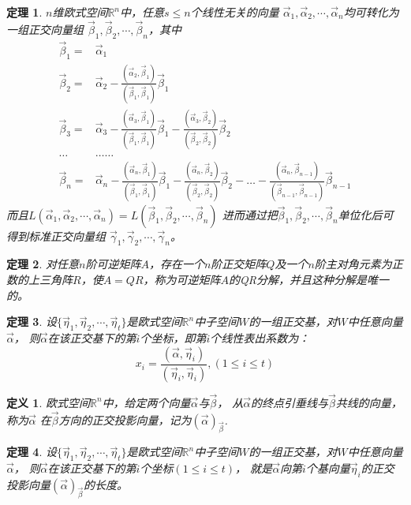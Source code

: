 \documentclass[a4paper]{book}
\newtheorem{Def}{定义}[chapter]
\newtheorem{thm}{定理}[chapter]
\begin{document}
\begin{thm}
$n$维欧式空间$\mathbb{R}^n$中，任意$s\leq n$个线性无关的向量
$\vec{\alpha}_1,\vec{\alpha}_2,\cdots,\vec{\alpha}_n$均可转化为一组正交向量组
$\vec{\beta}_1,\vec{\beta}_2,\cdots,\vec{\beta}_n$，其中
\begin{align*}
\vec{\beta}_1=&\vec{\alpha}_1\\
\vec{\beta}_2=&\vec{\alpha}_2-\frac{(\vec{\alpha}_2,\vec{\beta}_1)}{(\vec{\beta}_1,\vec{\beta}_1)}\vec{\beta}_1\\
\vec{\beta}_3=&\vec{\alpha}_3-\frac{(\vec{\alpha}_3,\vec{\beta}_1)}{(\vec{\beta}_1,\vec{\beta}_1)}\vec{\beta}_1-
              \frac{(\vec{\alpha}_3,\vec{\beta}_2)}{(\vec{\beta}_2,\vec{\beta}_2)}\vec{\beta}_2\\
\ldots&\ldots\ldots \\
\vec{\beta}_n=&\vec{\alpha}_n-\frac{(\vec{\alpha}_n,\vec{\beta}_1)}{(\vec{\beta}_1,\vec{\beta}_1)}\vec{\beta}_1
              -\frac{(\vec{\alpha}_n,\vec{\beta}_2)}{(\vec{\beta}_2,\vec{\beta}_2)}\vec{\beta}_2-\ldots
                -\frac{(\vec{\alpha}_n,\vec{\beta}_{n-1})}{(\vec{\beta}_{n-1},\vec{\beta}_{n-1})}\vec{\beta}_{n-1}
\end{align*}
而且$L(\vec{\alpha}_1,\vec{\alpha}_2,\cdots,\vec{\alpha}_n)=L(\vec{\beta}_1,\vec{\beta}_2,\cdots,\vec{\beta}_n)$
进而通过把$\vec{\beta}_1,\vec{\beta}_2,\cdots,\vec{\beta}_n$单位化后可得到标准正交向量组
$\vec{\gamma}_1,\vec{\gamma}_2,\cdots,\vec{\gamma}_n$。
\end{thm}

\begin{thm}
对任意$n$阶可逆矩阵$A$，存在一个$n$阶正交矩阵$Q$及一个$n$阶主对角元素为正数的上三角阵$R$，使$A=QR$，称为可逆矩阵$A$的QR分解，并且这种分解是唯一的。
\end{thm}

\begin{thm}
设$\{\vec{\eta}_1,\vec{\eta}_2,\cdots,\vec{\eta}_t\}$是欧式空间$\mathbb{R}^n$中子空间$W$的一组正交基，对$W$中任意向量$\vec{\alpha}$，
则$\vec{\alpha}$在该正交基下的第$i$个坐标，即第$i$个线性表出系数为：
\begin{equation*}
x_i=\frac{(\vec{\alpha},\vec{\eta}_i)}{(\vec{\eta}_i,\vec{\eta}_i)},
(1\leq i\leq t)
\end{equation*}
\end{thm}

\begin{Def}
欧式空间$\mathbb{R}^n$中，给定两个向量$\vec{\alpha}$与$\vec{\beta}$，
从$\vec{\alpha}$的终点引垂线与$\vec{\beta}$共线的向量，称为$\vec{\alpha}$
在$\vec{\beta}$方向的正交投影向量，记为$(\vec{\alpha})_{\vec{\beta}}$.
\end{Def}
\begin{thm}
设$\{\vec{\eta}_1,\vec{\eta}_2,\cdots,\vec{\eta}_t\}$是欧式空间$\mathbb{R}^n$中子空间$W$的一组正交基，对$W$中任意向量$\vec{\alpha}$，
则$\vec{\alpha}$在该正交基下的第$i$个坐标$(1\leq i\leq t)$，
就是$\vec{\alpha}$向第$i$个基向量$\vec{\eta}_i$的正交投影向量$(\vec{\alpha})_{\vec{\beta}}$的长度。
\end{thm}
\end{document}
